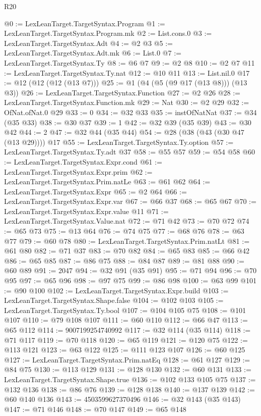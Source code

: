 \begin{lexlean}{R20}
\begin{coremodule}
@0 := LexLeanTarget.TargetSyntax.Program
@1 := LexLeanTarget.TargetSyntax.Program.mk
@2 := List.cons.{0}
@3 := LexLeanTarget.TargetSyntax.Adt
@4 := @2 @3
@5 := LexLeanTarget.TargetSyntax.Adt.mk
@6 := List.{0}
@7 := LexLeanTarget.TargetSyntax.Ty
@8 := @6 @7
@9 := @2 @8
@10 := @2 @7
@11 := LexLeanTarget.TargetSyntax.Ty.nat
@12 := @10 @11
@13 := List.nil.{0}
@17 := @12 (@12 (@12 (@13 @7)))
@25 := @1 (@4 (@5 (@9 @17 (@13 @8))) (@13 @3))
@26 := LexLeanTarget.TargetSyntax.Function
@27 := @2 @26
@28 := LexLeanTarget.TargetSyntax.Function.mk
@29 := Nat
@30 := @2 @29
@32 := OfNat.ofNat.{0} @29
@33 := 0
@34 := @32 @33
@35 := instOfNatNat
@37 := @34 (@35 @33)
@38 := @30 @37
@39 := 1
@42 := @32 @39 (@35 @39)
@43 := @30 @42
@44 := 2
@47 := @32 @44 (@35 @44)
@54 := @28 (@38 (@43 (@30 @47 (@13 @29)))) @17
@55 := LexLeanTarget.TargetSyntax.Ty.option
@57 := LexLeanTarget.TargetSyntax.Ty.adt @37
@58 := @55 @57
@59 := @54 @58
@60 := LexLeanTarget.TargetSyntax.Expr.cond
@61 := LexLeanTarget.TargetSyntax.Expr.prim
@62 := LexLeanTarget.TargetSyntax.Prim.natLe
@63 := @61 @62
@64 := LexLeanTarget.TargetSyntax.Expr
@65 := @2 @64
@66 := LexLeanTarget.TargetSyntax.Expr.var
@67 := @66 @37
@68 := @65 @67
@70 := LexLeanTarget.TargetSyntax.Expr.value @11
@71 := LexLeanTarget.TargetSyntax.Value.nat
@72 := @71 @42
@73 := @70 @72
@74 := @65 @73
@75 := @13 @64
@76 := @74 @75
@77 := @68 @76
@78 := @63 @77
@79 := @60 @78
@80 := LexLeanTarget.TargetSyntax.Prim.natLt
@81 := @61 @80
@82 := @71 @37
@83 := @70 @82
@84 := @65 @83
@85 := @66 @42
@86 := @65 @85
@87 := @86 @75
@88 := @84 @87
@89 := @81 @88
@90 := @60 @89
@91 := 2047
@94 := @32 @91 (@35 @91)
@95 := @71 @94
@96 := @70 @95
@97 := @65 @96
@98 := @97 @75
@99 := @86 @98
@100 := @63 @99
@101 := @90 @100
@102 := LexLeanTarget.TargetSyntax.Expr.build
@103 := LexLeanTarget.TargetSyntax.Shape.false
@104 := @102 @103
@105 := LexLeanTarget.TargetSyntax.Ty.bool
@107 := @104 @105 @75
@108 := @101 @107
@110 := @79 @108 @107
@111 := @60 @110
@112 := @66 @47
@113 := @65 @112
@114 := 9007199254740992
@117 := @32 @114 (@35 @114)
@118 := @71 @117
@119 := @70 @118
@120 := @65 @119
@121 := @120 @75
@122 := @113 @121
@123 := @63 @122
@125 := @111 @123 @107
@126 := @60 @125
@127 := LexLeanTarget.TargetSyntax.Prim.natEq
@128 := @61 @127
@129 := @84 @75
@130 := @113 @129
@131 := @128 @130
@132 := @60 @131
@133 := LexLeanTarget.TargetSyntax.Shape.true
@136 := @102 @133 @105 @75
@137 := @132 @136
@138 := @86 @76
@139 := @128 @138
@140 := @137 @139
@142 := @60 @140 @136
@143 := 4503599627370496
@146 := @32 @143 (@35 @143)
@147 := @71 @146
@148 := @70 @147
@149 := @65 @148

\end{coremodule}
\end{lexlean}
